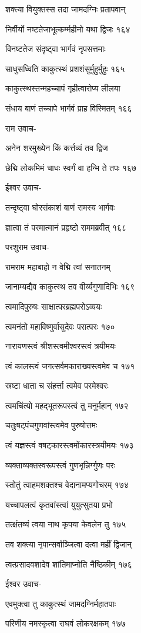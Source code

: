 शक्त्या वियुक्तस्स तदा जामदग्निः प्रतापवान्

निर्वीर्यो नष्टतेजाभूत्कर्म्महीनो यथा द्विजः १६४

विनष्टतेज संदृष्ट्वा भार्गवं नृपसत्तमाः

साधुसध्विति काकुत्स्थं प्रशशंसुर्मुहुर्मुहुः १६५

काकुत्स्थस्तन्महच्चापं गृहीत्वारोप्य लीलया

संधाय बाणं तच्चापे भार्गवं प्राह विस्मितम् १६६

राम उवाच-

अनेन शरमुख्येन किं कर्त्तव्यं तव द्विज

छेद्मि लोकमिमं चाधः स्वर्गं वा हन्मि ते तपः १६७

ईश्वर उवाच-

तन्दृष्ट्वा घोरसंकाशं बाणं रामस्य भार्गवः

ज्ञात्वा तं परमात्मानं प्रहृष्टो राममब्रवीत् १६८

परशुराम उवाच-

रामराम महाबाहो न वेद्मि त्वां सनातनम्

जानाम्यद्यैव काकुत्स्थ तव वीर्य्यगुणादिभिः १६९

त्वमादिपुरुषः साक्षात्परब्रह्मपरोऽव्ययः

त्वमनंतो महाविष्णुर्वासुदेवः परात्परः १७०

नारायणस्त्वं श्रीशस्त्वमीश्वरस्त्वं त्रयीमयः

त्वं कालस्त्वं जगत्सर्वमकाराख्यस्त्वमेव च १७१

स्रष्टा धाता च संहर्त्ता त्वमेव परमेश्वरः

त्वमचिंत्यो महद्भूतरूपस्त्वं तु मनुर्महान् १७२

चतुःषट्पंचगुणवांस्त्वमेव पुरुषोत्तमः

त्वं यज्ञस्त्वं वषट्कारस्त्वमोंकारस्त्रयीमयः १७३

व्यक्ताव्यक्तस्वरूपस्त्वं गुणभृन्निर्ग्गुणः परः

स्तोतुं त्वाहमशक्तश्च वेदानामप्यगोचरम् १७४

यच्चापलत्वं कृतवांस्त्वां युयुत्सुतया प्रभो

तत्क्षंतव्यं त्वया नाथ कृपया केवलेन तु १७५

तव शक्त्या नृपान्सर्वाञ्जित्वा दत्वा महीं द्विजान्

त्वत्प्रसादवशादेव शांतिमाप्नोति नैष्ठिकीम् १७६

ईश्वर उवाच-

एवमुक्त्वा तु काकुत्स्थं जामदग्निर्महातपाः

परिणीय नमस्कृत्वा राघवं लोकरक्षकम् १७७

